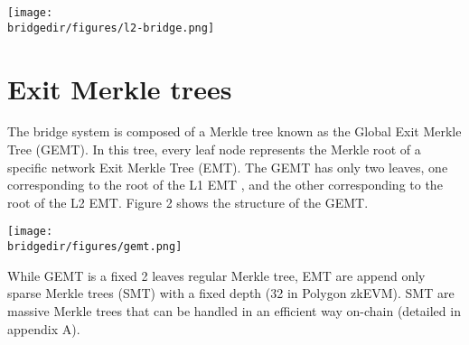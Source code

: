 \begin{center}
	\texttt{[image: \\bridgedir/figures/l2-bridge.png]}
	
\end{center}







 




\section{Exit Merkle trees}

The bridge system is composed of a Merkle tree known as the Global Exit Merkle Tree (GEMT). In this tree, every leaf node represents the Merkle root of a specific network Exit Merkle Tree (EMT). The GEMT has only two leaves, one corresponding to the root of the L1 EMT , and the other corresponding to the root of the L2 EMT. Figure 2 shows the structure of the GEMT.

\begin{center}
	\texttt{[image: \\bridgedir/figures/gemt.png]}
	
	
\end{center}

While GEMT is a fixed 2 leaves regular Merkle tree, EMT are append only sparse Merkle trees (SMT) with a fixed depth (32 in Polygon zkEVM). SMT are massive Merkle trees that can be handled in an efficient way on-chain (detailed in appendix A). 

